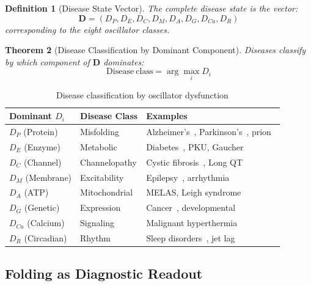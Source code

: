 \documentclass[aps,prd,twocolumn,superscriptaddress,floatfix,nofootinbib]{revtex4-2}
\newtheorem{theorem}{Theorem}[section]
\newtheorem{definition}[theorem]{Definition}
\theoremstyle{remark}
\begin{document}
\begin{definition}[Disease State Vector]
\label{def:disease_vector}
The complete disease state is the vector:
\begin{equation}
\mathbf{D} = (D_P, D_E, D_C, D_M, D_A, D_G, D_{Ca}, D_R)
\end{equation}
corresponding to the eight oscillator classes.
\end{definition}

\begin{theorem}[Disease Classification by Dominant Component]
\label{thm:disease_classification}
Diseases classify by which component of $\mathbf{D}$ dominates:
\begin{equation}
\mathrm{Disease\ class} = \arg\max_i D_i
\end{equation}
\end{theorem}

\begin{table}[h]
\centering
\caption{Disease classification by oscillator dysfunction}
\label{tab:disease_class}
\begin{tabular}{@{}lll@{}}
\toprule
Dominant $D_i$ & Disease Class & Examples \\
\midrule
$D_P$ (Protein) & Misfolding & Alzheimer's~\cite{selkoe2016}, Parkinson's~\cite{spillantini1997}, prion~\cite{prusiner1998} \\
$D_E$ (Enzyme) & Metabolic & Diabetes~\cite{defronzo2015}, PKU, Gaucher~\cite{brady1966} \\
$D_C$ (Channel) & Channelopathy & Cystic fibrosis~\cite{riordan1989}, Long QT~\cite{sanguinetti2006} \\
$D_M$ (Membrane) & Excitability & Epilepsy~\cite{reid2012}, arrhythmia \\
$D_A$ (ATP) & Mitochondrial & MELAS, Leigh syndrome~\cite{wallace2005} \\
$D_G$ (Genetic) & Expression & Cancer~\cite{hanahan2011}, developmental \\
$D_{Ca}$ (Calcium) & Signaling & Malignant hyperthermia~\cite{rosenberg2015} \\
$D_R$ (Circadian) & Rhythm & Sleep disorders~\cite{potter2016}, jet lag \\
\bottomrule
\end{tabular}
\end{table}

\subsection{Folding as Diagnostic Readout}
\end{document}
